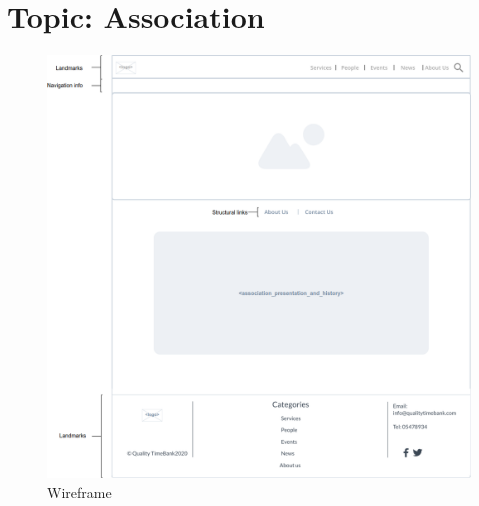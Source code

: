\documentclass[a4paper, 11pt, parskip=half, headsepline]{scrreprt}
\begin{document}
\section{Topic: Association}

\begin{figure}[H]
    \centering
    \includegraphics[width=1\linewidth, keepaspectratio]{wireframes/Topic-AboutUs}
    \caption{Wireframe}
\end{figure}
\end{document}
